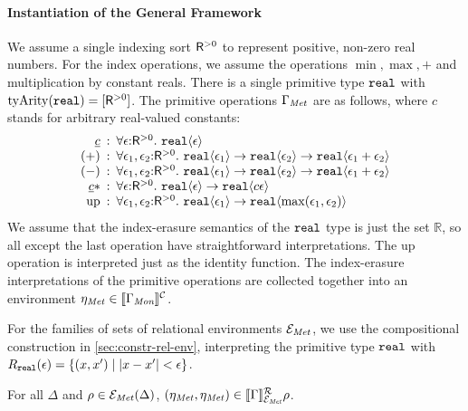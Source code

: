 \paragraph{Instantiation of the General Framework}
We assume a single indexing sort $\mathsf{R}^{>0}$ %
to represent positive, non-zero real numbers. For the index
operations, we assume the operations $\min, \max, +$ and
multiplication by constant reals. There is a single primitive type
$\textup{\texttt{real}}$ with $\mathrm{tyArity}(\textup{\texttt{real}}) =
[\mathsf{R}^{>0}]$. The primitive operations $\Gamma_{\mathit{Met}}$ are as
follows, where $c$ stands for arbitrary real-valued constants:
\begin{displaymath}
  \begin{array}{r@{\hspace{0.5em}:\hspace{0.5em}}l}
    \underline{c} & \forall \epsilon\mathord:\metricSort.\ \tyPrim{real}{\epsilon} \\
    (+) & \forall \epsilon_1, \epsilon_2\mathord:\metricSort.\ \tyPrim{real}{\epsilon_1} \to \tyPrim{real}{\epsilon_2} \to \tyPrim{real}{\epsilon_1 + \epsilon_2} \\
    (-) & \forall \epsilon_1, \epsilon_2\mathord:\metricSort.\ \tyPrim{real}{\epsilon_1} \to \tyPrim{real}{\epsilon_2} \to \tyPrim{real}{\epsilon_1 + \epsilon_2} \\
    \underline{c} * & \forall \epsilon\mathord:\metricSort.\ \tyPrim{real}{\epsilon} \to \tyPrim{real}{c\epsilon} \\
    \mathrm{up} & \forall \epsilon_1,\epsilon_2\mathord:\metricSort.\ \tyPrim{real}{\epsilon_1} \to \tyPrim{real}{\max(\epsilon_1,\epsilon_2)}
  \end{array}
\end{displaymath}
We assume that the index-erasure semantics of the $\textup{\texttt{real}}$
type is just the set $\mathbb{R}$, so all except the last operation
have straightforward interpretations. The $\mathrm{up}$ operation is
interpreted just as the identity function. The index-erasure
interpretations of the primitive operations are collected together
into an environment $\eta_{\mathit{Met}} \in \llbracket \Gamma_{\textit{Mon}} \rrbracket^{\mathcal{C}}$.

For the families of sets of relational environments
$\mathcal{E}_{\mathit{Met}}$, we use the compositional construction in
\autoref{sec:constr-rel-env}, interpreting the primitive type
$\textup{\texttt{real}}$ with $R_{\textup{\texttt{real}}}(\epsilon) = \{ (x,x')
\mathrel| |x - x'| < \epsilon\}$.
\begin{lemma}\label{lem:metric-environments}
  For all $\Delta$ and $\rho \in \mathcal{E}_{\mathit{Met}}(\Delta)$,
  $(\eta_{\mathit{Met}}, \eta_{\mathit{Met}}) \in
  \llbracket \Gamma \rrbracket^{\mathcal{R}}_{\mathcal{E}_{\mathit{Met}}}{\rho}$.
\end{lemma}

